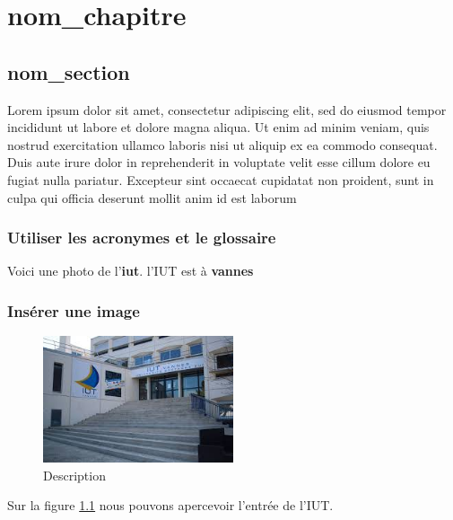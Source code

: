 \documentclass[french]{report}
\begin{document}
\clearpage

\tableofcontents
\clearpage



\chapter{nom\_chapitre}
    \section{nom\_section}
    Lorem ipsum dolor sit amet, consectetur adipiscing elit, sed do eiusmod tempor incididunt ut labore et dolore magna aliqua. Ut enim ad minim veniam, quis nostrud exercitation ullamco laboris nisi ut aliquip ex ea commodo consequat. Duis aute irure dolor in reprehenderit in voluptate velit esse cillum dolore eu fugiat nulla pariatur. Excepteur sint occaecat cupidatat non proident, sunt in culpa qui officia deserunt mollit anim id est laborum
    
    

    \subsection{Utiliser les acronymes et le glossaire}
    Voici une photo de l'\textbf{\acrshort{iut}}. 
    l'IUT est à \textbf{\Gls{vannes}}
    
    
    
    \subsection{Insérer une image}
    \begin{figure}[!h]
            \center
            \includegraphics[width=0.5\textwidth]{Images/AccueilIut.jpg}
            \caption{Description}
            \label{fig:AccueilIut}
    \end{figure}
    Sur la figure \ref{fig:AccueilIut} nous pouvons apercevoir l'entrée de l'IUT.
    
\end{document}
